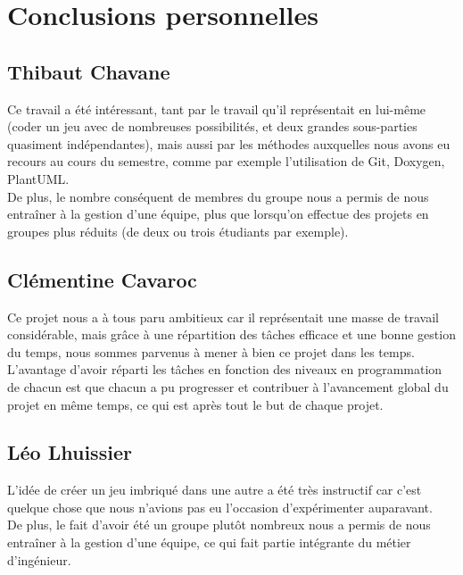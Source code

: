 \chapter{Conclusions personnelles}
    \section{Thibaut Chavane}
        Ce travail a été intéressant, tant par le travail qu'il représentait en lui-même (coder un jeu avec de nombreuses possibilités, et deux grandes sous-parties quasiment indépendantes), mais aussi par les méthodes auxquelles nous avons eu recours au cours du semestre, comme par exemple l'utilisation de Git, Doxygen, PlantUML. \\
        De plus, le nombre conséquent de membres du groupe nous a permis de nous entraîner à la gestion d'une équipe, plus que lorsqu'on effectue des projets en groupes plus réduits (de deux ou trois étudiants par exemple).
    \section{Clémentine Cavaroc}
        Ce projet nous a à tous paru ambitieux car il représentait une masse de travail considérable, mais grâce à une répartition des tâches efficace et une bonne gestion du temps, nous sommes parvenus à mener à bien ce projet dans les temps. \\
        L'avantage d'avoir réparti les tâches en fonction des niveaux en programmation de chacun est que chacun a pu progresser et contribuer à l'avancement global du projet en même temps, ce qui est après tout le but de chaque projet.
    \section{Léo Lhuissier}
        L'idée de créer un jeu imbriqué dans une autre a été très instructif car c'est quelque chose que nous n'avions pas eu l'occasion d'expérimenter auparavant. \\
        De plus, le fait d'avoir été un groupe plutôt nombreux nous a permis de nous entraîner à la gestion d'une équipe, ce qui fait partie intégrante du métier d'ingénieur.
